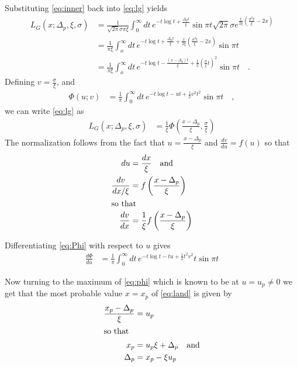 \documentclass[11pt]{article}
\begin{document}
Substituting \eqref{eq:inner} back into \eqref{eq:lg} yields 
\begin{align}
  L_{G}(x;\Delta_p,\xi,\sigma) &= \frac{1}{\sqrt{2\pi}\sigma\pi\xi}
   \int_0^{\infty}dt\,e^{-t\log{t} + \frac{\Delta_p t}{\xi}}\sin{\pi t}
   \sqrt{2\pi}\sigma e^{\frac{t}{2\xi}\left(\frac{\sigma^2t}{\xi}-2x\right)}\nonumber\\
   &= \frac{1}{\pi\xi}\int_o^{\infty}dt\,e^{-t\log{t} + \frac{\Delta_pt}{\xi}+
     \frac{t}{2\xi}\left(\frac{\sigma^2t}{\xi}-2x\right)}\sin{\pi
     t}\nonumber\\
   &= \frac{1}{\pi\xi}\int_o^{\infty}dt\,e^{-t\log{t} - \frac{(x
       -\Delta_p)t}{\xi} + \frac12\left(\frac{\sigma}{\xi}t\right)^2}\sin{\pi
       t}\quad.
\end{align}
Defining $v=\frac{\sigma}{\xi}$, and 
\begin{align}
  \Phi(u;v) &= \frac{1}{\pi}\int_0^{\infty}dt\,e^{-t\log{t} - ut +
    \frac12v^2t^2}\sin{\pi t}\label{eq:Phi}\quad,
\end{align}
we can write \eqref{eq:lg} as 
\begin{align}
  L_{G}(x;\Delta_p,\xi,\sigma) &=
  \frac1\xi\Phi\left(\frac{x-\Delta_p}{\xi},\frac\sigma\xi\right)\label{eq:lg2}
\end{align}
The normalization follows from the fact that
$u=\frac{x-\Delta_p}{\xi}$ and $\frac{dv}{du}=f(u)$ so that 
\begin{align*}
  du &= \frac{dx}{\xi}\quad\text{and}\\
  \frac{dv}{dx/\xi} &= f\left(\frac{x-\Delta_p}{\xi}\right)\\
  \intertext{so that}
  \frac{dv}{dx} &= \frac1\xi f\left(\frac{x-\Delta_p}{\xi}\right)
\end{align*}

Differentiating \eqref{eq:Phi} with respect to $u$ gives 
\begin{align}
  \frac{d\Phi}{du} &= 
  \frac{1}{\pi}
  \int_0^{\infty}dt\,e^{-t\log{t}-tu+\frac12t^2v^2}t\sin{\pi t}
\end{align}

Now turning to the maximum of \eqref{eq:phi} which is known to be at
$u=u_p\neq0$ we get that the most probable value $x=x_p$ of
\eqref{eq:land} is given by
\begin{align}
  \frac{x_p-\Delta_p}{\xi} &= u_p\nonumber\\
  \intertext{so that}
  x_p &= u_p\xi + \Delta_p\quad\text{and}\nonumber\\
  \Delta_p &= x_p - \xi u_p
\end{align}
\end{document}
